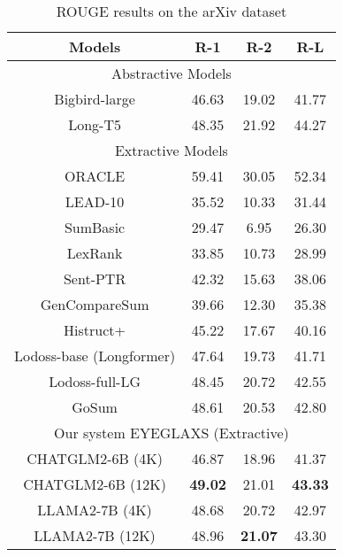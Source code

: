 \begin{table}
    \centering
    \small
    \begin{tabular}{|c|c|c|c|} \hline 
         Models&  R-1&  R-2& R-L\\ \hline 
         \multicolumn{4}{|c|}{Abstractive Models}\\ \hline 
         Bigbird-large&46.63&19.02&41.77\\ \hline 
         Long-T5& 48.35 & 21.92 & 44.27 \\ \hline 
         \multicolumn{4}{|c|}{Extractive Models}\\ \hline 
         ORACLE& 59.41 & 30.05 & 52.34 \\ \hline 
 LEAD-10&35.52 &10.33 &31.44\\ \hline 
 SumBasic&29.47 &6.95&26.30\\ \hline 
 LexRank&33.85 &10.73 &28.99\\ \hline 
 Sent-PTR& 42.32& 15.63&38.06\\ \hline 
 GenCompareSum& 39.66& 12.30&35.38\\ \hline 
 Histruct+& 45.22& 17.67&40.16\\ \hline 
 Lodoss-base (Longformer)& 47.64& 19.73&41.71\\ \hline 
 Lodoss-full-LG& 48.45& 20.72&42.55\\ \hline 
 GoSum& 48.61& 20.53&42.80\\\hline \hline 
 \multicolumn{4}{|c|}{Our system EYEGLAXS (Extractive)}\\ \hline 
 CHATGLM2-6B (4K)& 46.87&18.96 &41.37 \\ \hline 
 CHATGLM2-6B (12K)&\textbf{49.02}& 21.01&\textbf{43.33} \\ \hline  
 LLAMA2-7B (4K)& 48.68& 20.72&42.97\\ \hline 
 LLAMA2-7B (12K)&48.96 &\textbf{21.07} &43.30\\ \hline
    \end{tabular}
    \caption{ROUGE results on the arXiv dataset}
    \label{tab:result_arxiv}
\end{table}

